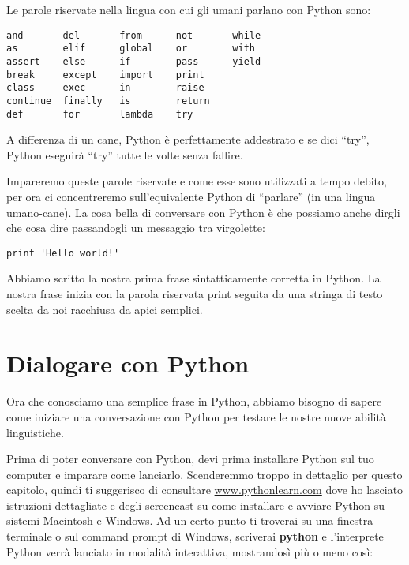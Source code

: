 Le parole riservate nella lingua con cui gli umani parlano con Python sono:

\beforeverb
\begin{verbatim}
and       del       from      not       while    
as        elif      global    or        with     
assert    else      if        pass      yield    
break     except    import    print              
class     exec      in        raise              
continue  finally   is        return             
def       for       lambda    try
\end{verbatim}
\afterverb
%
A differenza di un cane, Python \`{e} perfettamente addestrato e se dici {``}try'', Python eseguir\`{a} {``}try'' tutte le volte senza fallire.


Impareremo queste parole riservate e come esse sono utilizzati a tempo debito, per ora ci concentreremo sull'equivalente Python di {``}parlare'' (in una lingua umano-cane). La cosa bella di conversare con Python \`{e} che possiamo anche dirgli che cosa dire passandogli un messaggio tra virgolette:

\beforeverb
\begin{verbatim}
print 'Hello world!'
\end{verbatim}
\afterverb

Abbiamo scritto la nostra prima frase sintatticamente corretta in Python. La nostra frase inizia con la parola riservata print seguita da una stringa di testo scelta da noi racchiusa da apici semplici.

\section{Dialogare con Python}

Ora che conosciamo una semplice frase in Python, abbiamo bisogno di sapere come iniziare una conversazione con Python per testare le nostre nuove abilit\`{a} linguistiche.

Prima di poter conversare con Python, devi prima installare Python sul tuo computer e imparare come lanciarlo. Scenderemmo troppo in dettaglio per questo capitolo, quindi ti suggerisco di consultare \url{www.pythonlearn.com} dove ho lasciato istruzioni dettagliate e degli screencast su come installare e avviare Python su sistemi Macintosh e Windows. Ad un certo punto ti troverai su una finestra terminale o sul command prompt di Windows, scriverai \textbf{python }e l'interprete Python verr\`{a} lanciato in modalit\`{a} interattiva, mostrandos\`{i} pi\`{u} o meno cos\`{i}:

